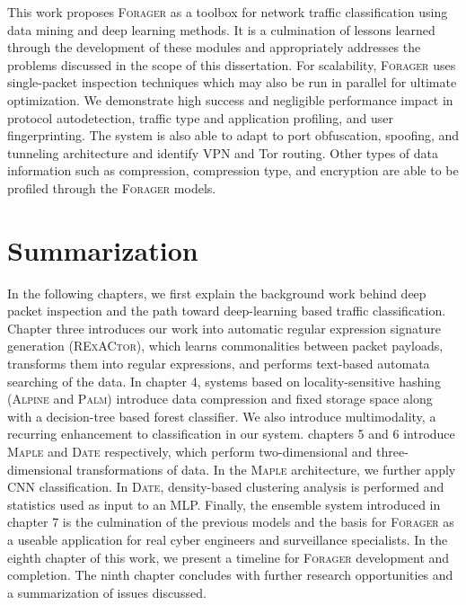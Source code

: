 This work proposes \textsc{Forager} as a toolbox for network traffic classification using data mining and deep learning methods. It is a culmination of lessons learned through the development of these modules and appropriately addresses the problems discussed in the scope of this dissertation. For scalability, \textsc{Forager} uses single-packet inspection techniques which may also be run in parallel for ultimate optimization. We demonstrate high success and negligible performance impact in protocol autodetection, traffic type and application profiling, and user fingerprinting. The system is also able to adapt to port obfuscation, spoofing, and tunneling architecture and identify VPN and Tor routing. Other types of data information such as compression, compression type, and encryption are able to be profiled through the \textsc{Forager} models.

\section{Summarization}

In the following chapters, we first explain the background work behind deep packet inspection and the path toward deep-learning based traffic classification. Chapter three introduces our work into automatic regular expression signature generation (\textsc{RExACtor}), which learns commonalities between packet payloads, transforms them into regular expressions, and performs text-based automata searching of the data. In chapter 4, systems based on locality-sensitive hashing (\textsc{Alpine} and \textsc{Palm}) introduce data compression and fixed storage space along with a decision-tree based forest classifier. We also introduce multimodality, a recurring enhancement to classification in our system. chapters 5 and 6 introduce \textsc{Maple} and \textsc{Date} respectively, which perform two-dimensional and three-dimensional transformations of data. In the \textsc{Maple} architecture, we further apply CNN classification. In \textsc{Date}, density-based clustering analysis is performed and statistics used as input to an MLP. Finally, the ensemble system introduced in chapter 7 is the culmination of the previous models and the basis for \textsc{Forager} as a useable application for real cyber engineers and surveillance specialists. In the eighth chapter of this work, we present a timeline for \textsc{Forager} development and completion. The ninth chapter concludes with further research opportunities and a summarization of issues discussed.
